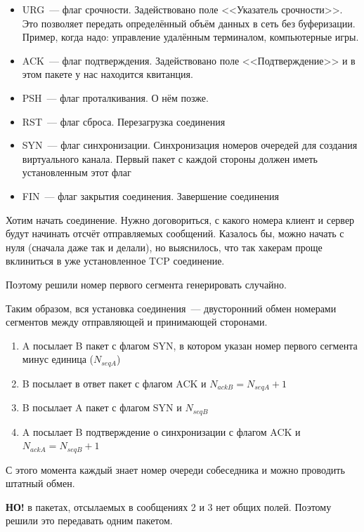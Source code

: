 \begin{itemize}
    \item URG~--- флаг срочности. Задействовано поле <<Указатель срочности>>. Это позволяет передать определённый объём данных в сеть без буферизации. Пример, когда надо: управление удалённым терминалом, компьютерные игры.
    \item ACK~--- флаг подтверждения. Задействовано поле <<Подтверждение>> и в этом пакете у нас находится квитанция.
    \item PSH~--- флаг проталкивания. О нём позже.
    \item RST~--- флаг сброса. Перезагрузка соединения
    \item SYN~--- флаг синхронизации. Синхронизация номеров очередей для создания виртуального канала. Первый пакет с каждой стороны должен иметь установленным этот флаг
    \item FIN~--- флаг закрытия соединения. Завершение соединения
\end{itemize}


Хотим начать соединение. Нужно договориться, с какого номера клиент и сервер будут начинать отсчёт отправляемых сообщений. Казалось бы, можно начать с нуля (сначала даже так и делали), но выяснилось, что так хакерам проще вклиниться в уже установленное TCP соединение.

Поэтому решили номер первого сегмента генерировать случайно. 

Таким образом, вся установка соединения~--- двусторонний обмен номерами сегментов между отправляющей и принимающей сторонами.

\begin{enumerate}
    \item A посылает B пакет с флагом SYN, в котором указан номер первого сегмента минус единица ($N_{seqA}$)
    \item B посылает в ответ пакет с флагом ACK и $N_{ackB}=N_{seqA}+1$
    \item B посылает A пакет с флагом SYN и $N_{seqB}$
    \item A посылает B подтверждение о синхронизации с флагом ACK и $N_{ackA}=N_{seqB}+1$
\end{enumerate}

С этого момента каждый знает номер очереди собеседника и можно проводить штатный обмен.

{\bf НО!} в пакетах, отсылаемых в сообщениях 2 и 3 нет общих полей. Поэтому решили это передавать одним пакетом.

